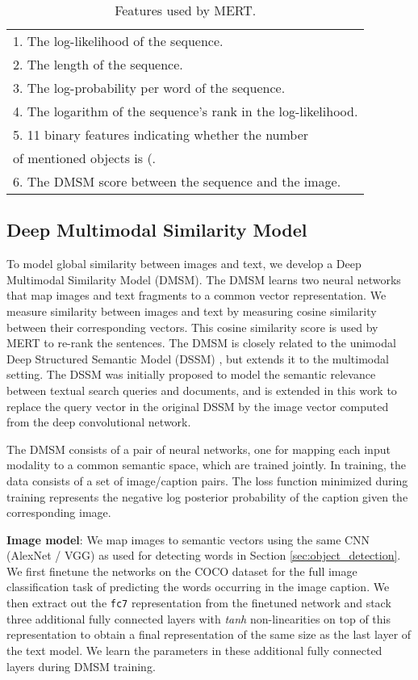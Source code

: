 \documentclass[10pt,twocolumn,letterpaper]{article}
\begin{document}
\begin{table}\centering\small
\caption{Features used by MERT.}
\vspace{1mm}\label{tab:MERT}
\begin{tabular}{l}
\toprule
	1. The log-likelihood of the sequence.\\
	2. The length of the sequence.\\
	3. The log-probability per word of the sequence.\\
	4. The logarithm of the sequence's rank in the log-likelihood.\\
	5. 11 binary features indicating whether the number\\
	    of mentioned objects is  (.\\
	6. The DMSM score between the sequence and the image.\\
\bottomrule
\end{tabular}
\vspace{-1.5em}
\end{table}

\subsection {Deep Multimodal Similarity Model}

To model global similarity between images and text, we develop a Deep Multimodal Similarity Model (DMSM). The DMSM learns two neural networks that map images and text fragments to a common vector representation. We measure similarity between images and text by measuring cosine similarity between their corresponding vectors. This cosine similarity score is used by MERT to re-rank the sentences. The DMSM is closely related to the unimodal Deep Structured Semantic Model (DSSM) \cite{huang2013,Shen2014}, but extends it to the multimodal setting. The DSSM was initially proposed to model the semantic relevance between textual search queries and documents, and is extended in this work to replace the query vector in the original DSSM by the image vector computed from the deep convolutional network.

The DMSM consists of a pair of neural networks, one for mapping each input modality to a common semantic space, which are trained jointly. In training, the data consists of a set of image/caption pairs. The loss function minimized during training represents the negative log posterior probability of the caption given the corresponding image.

\textbf{Image model}: We map images to semantic vectors using the same CNN (AlexNet / VGG) as used for detecting words in Section \ref{sec:object_detection}. We first finetune the networks on the COCO dataset for the full image classification task of predicting the words occurring in the image caption. We then extract out the \texttt{fc7} representation from the finetuned network and stack three additional fully connected layers with \textit{tanh} non-linearities on top of this representation to obtain a final representation of the same size as the last layer of the text model. We learn the parameters in these additional fully connected layers during DMSM training.
\end{document}
